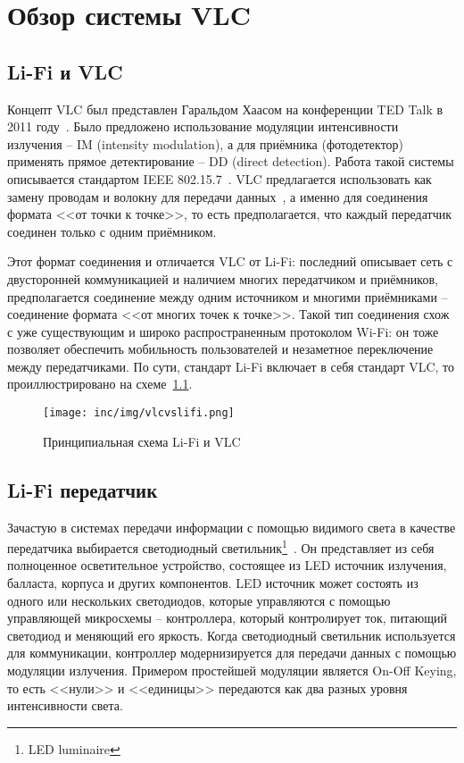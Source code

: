 \chapter{Обзор системы VLC}

\section{Li-Fi и VLC}


Концепт VLC был представлен Гаральдом Хаасом на конференции TED Talk в 2011 году~\cite{Haas2011}. Было предложено использование модуляции интенсивности излучения \--- IM (intensity modulation), а для приёмника (фотодетектор) применять прямое детектирование \--- DD (direct detection). Работа такой системы описывается стандартом IEEE 802.15.7~\cite{IEEE2018}. VLC предлагается использовать как замену проводам и волокну для передачи данных~\cite{Haas16}, а именно для соединения формата <<от точки к точке>>, то есть предполагается, что каждый передатчик соединен только с одним приёмником.

Этот формат соединения и отличается VLC от Li-Fi: последний описывает сеть с двусторонней коммуникацией и наличием многих передатчиком и приёмников, предполагается соединение между одним источником и многими приёмниками \--- соединение формата <<от многих точек к точке>>. Такой тип соединения схож с уже существующим и широко распространенным протоколом Wi-Fi: он тоже позволяет обеспечить мобильность пользователей и незаметное переключение между передатчиками. По сути, стандарт Li-Fi включает в себя стандарт VLC, то проиллюстрировано на схеме~\ref{fig:vlcvslifi}.

\begin{figure}[!ht]
    \centering
    \texttt{[image: inc/img/vlcvslifi.png]}
    \caption{Принципиальная схема Li-Fi и VLC~\cite{Haas16}}
    \label{fig:vlcvslifi}
\end{figure}

\section{Li-Fi передатчик}



Зачастую в системах передачи информации с помощью видимого света в качестве передатчика выбирается светодиодный светильник\footnote{LED luminaire}~\cite{LeMinh2008,Komine2006,Komine2004}. Он представляет из себя полноценное осветительное устройство, состоящее из LED источник излучения, балласта, корпуса и других компонентов. LED источник может состоять из одного или нескольких светодиодов, которые управляются с помощью управляющей микросхемы \--- контроллера, который контролирует ток, питающий светодиод и меняющий его яркость. Когда светодиодный светильник используется для коммуникации, контроллер модернизируется для передачи данных с помощью модуляции излучения. Примером простейшей модуляции является On-Off Keying, то есть <<нули>> и <<единицы>> передаются как два разных уровня интенсивности света.

